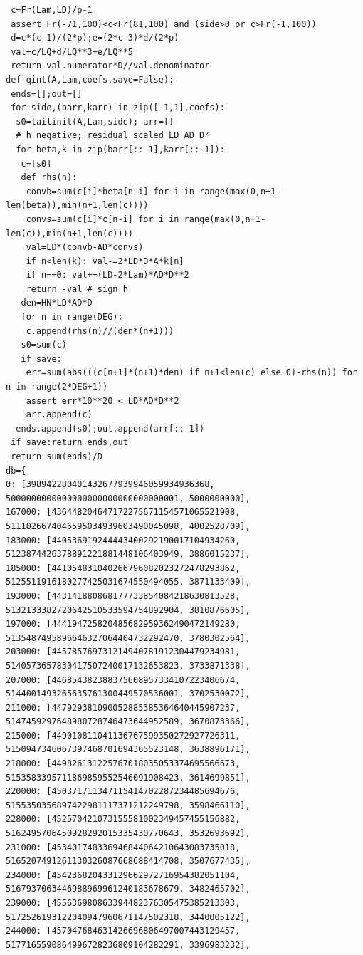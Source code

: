 \documentclass[11pt,a4paper]{article}
\numberwithin{equation}{section}
\theoremstyle{definition}
\theoremstyle{remark}
\begin{document}
\begin{lstlisting}
 c=Fr(Lam,LD)/p-1
 assert Fr(-71,100)<c<Fr(81,100) and (side>0 or c>Fr(-1,100))
 d=c*(c-1)/(2*p);e=(2*c-3)*d/(2*p)
 val=c/LQ+d/LQ**3+e/LQ**5
 return val.numerator*D//val.denominator
def qint(A,Lam,coefs,save=False):
 ends=[];out=[]
 for side,(barr,karr) in zip([-1,1],coefs):
  s0=tailinit(A,Lam,side); arr=[]
  # h negative; residual scaled LD AD D²
  for beta,k in zip(barr[::-1],karr[::-1]):
   c=[s0]
   def rhs(n):
    convb=sum(c[i]*beta[n-i] for i in range(max(0,n+1-len(beta)),min(n+1,len(c))))
    convs=sum(c[i]*c[n-i] for i in range(max(0,n+1-len(c)),min(n+1,len(c))))
    val=LD*(convb-AD*convs)
    if n<len(k): val-=2*LD*D*A*k[n]
    if n==0: val+=(LD-2*Lam)*AD*D**2
    return -val # sign h
   den=HN*LD*AD*D
   for n in range(DEG):
    c.append(rhs(n)//(den*(n+1)))
   s0=sum(c)
   if save:
    err=sum(abs(((c[n+1]*(n+1)*den) if n+1<len(c) else 0)-rhs(n)) for n in range(2*DEG+1))
    assert err*10**20 < LD*AD*D**2
    arr.append(c)
  ends.append(s0);out.append(arr[::-1])
 if save:return ends,out
 return sum(ends)/D
db={
0: [398942280401432677939946059934936368, 5000000000000000000000000000000001, 5000000000],
167000: [436448204647172275671154571065521908, 5111026674046595034939603490045098, 4002528709],
183000: [440536919244443400292190017104934260, 5123874426378891221881448106403949, 3886015237],
185000: [441054831040266796082023272478293862, 5125511916180277425031674550494055, 3871133409],
193000: [443141880868177733854084218630813528, 5132133382720642510533594754892904, 3810876605],
197000: [444194725820485682959362490472149280, 5135487495896646327064404732292470, 3780302564],
203000: [445785769731214940781912304479234981, 5140573657830417507240017132653823, 3733871338],
207000: [446854382388375608957334107223406674, 5144001493265635761300449570536001, 3702530072],
211000: [447929381090052885385364640445907237, 5147459297648980728746473644952589, 3670873366],
215000: [449010811041136767599350272927726311, 5150947346067397468701694365523148, 3638896171],
218000: [449826131225767018035053374695566673, 5153583395711869859552546091908423, 3614699851],
220000: [450371711347115414702287234485694676, 5155350356897422981117371212249798, 3598466110],
228000: [452570421073155581002349457455156882, 5162495706450928292015335430770643, 3532693692],
231000: [453401748336946844064210643083735018, 5165207491261130326087668688414708, 3507677435],
234000: [454236820433129662972716954382051104, 5167937063446988969961240183678679, 3482465702],
239000: [455636980863394482376305475385213303, 5172526193122040947960671147502318, 3440005122],
244000: [457047684631426696806497007443129457, 5177165590864996728236809104282291, 3396983232],

\end{lstlisting}
\end{document}
